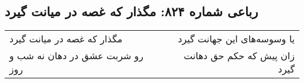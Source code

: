 \begin{center}
\section*{رباعی شماره ۸۲۴: مگذار که غصه در میانت گیرد}
\label{sec:0824}
\begin{longtable}{l p{0.5cm} r}
مگذار که غصه در میانت گیرد
&&
یا وسوسه‌های این جهانت گیرد
\\
رو شربت عشق در دهان نه شب و روز
&&
زان پیش که حکم حق دهانت گیرد
\\
\end{longtable}
\end{center}
